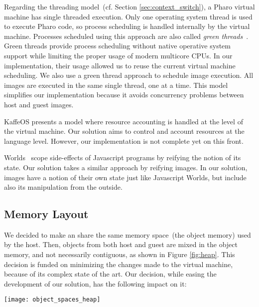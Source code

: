Regarding the threading model~(cf. Section \ref{sec:context_switch}), a Pharo virtual machine has single threaded execution. Only one operating system thread is used to execute Pharo code, so process scheduling is handled internally by the virtual machine. Processes scheduled using this approach are also called \emph{green threads}~. Green threads provide process scheduling without native operative system support while limiting the proper usage of modern multicore CPUs. In our implementation, their usage allowed us to reuse the current virtual machine scheduling. We also use a green thread approach to schedule image execution. All images are executed in the same single thread, one at a time. This model simplifies our implementation because it avoids concurrency problems between host and guest images.

KaffeOS presents a model where resource accounting is handled at the level of the virtual machine. Our solution aims to control and account resources at the language level. However, our implementation is not complete yet on this front.

Worlds~\cite{Wart08a} scope side-effects of Javascript programs by reifying the notion of its state. Our solution takes a similar approach by reifying images. In our solution, images have a notion of their own state just like Javascript Worlds, but include also its manipulation from the outside.



\subsection{Memory Layout} \label{sec:memory}

We decided to make an \objectspace share the same memory space~(the object memory) used by the host. Then, objects from both host and guest are mixed in the object memory, and not necessarily contiguous, as shown in Figure \ref{fig:heap}. This decision is funded on minimizing the changes made to the virtual machine, because of its complex state of the art. Our decision, while easing the development of our solution, has the following impact on it:

\begin{figure*}[htb]
\begin{center}
\texttt{[image: object\_spaces\_heap]}
\caption{Objects from the host and guest are mixed in the object memory. In this figure, after the ,  and  host instances, follow the corresponding ones of the guest, which can in order be followed by objects of the host, like the string \textbf{`hi'}. \label{fig:heap}}
\end{center}
\end{figure*}

